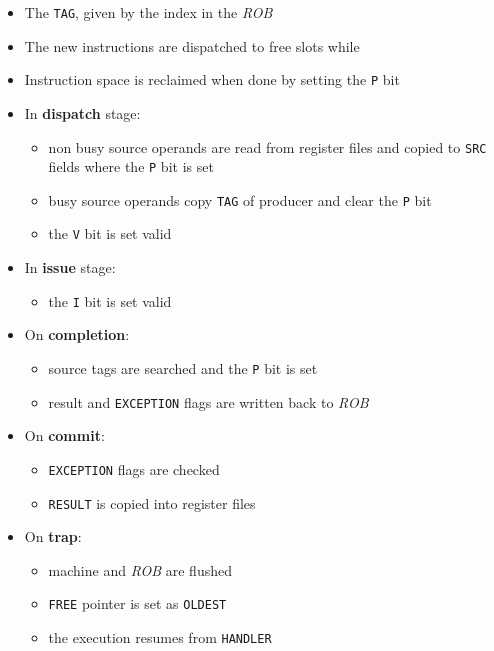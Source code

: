 \documentclass[english]{article}
\begin{document}
\begin{itemize}
  \item The \texttt{TAG}, given by the index in the \textit{ROB}
  \item The new instructions are dispatched to free slots while
  \item Instruction space is reclaimed when done by setting the \texttt{P} bit
  \item In \textbf{dispatch} stage:
        \begin{itemize}
          \item non busy source operands are read from register files and copied to \texttt{SRC} fields where the \texttt{P} bit is set
          \item busy source operands copy \texttt{TAG} of producer and clear the \texttt{P} bit
          \item the \texttt{V} bit is set valid
        \end{itemize}
  \item In \textbf{issue} stage:
        \begin{itemize}
          \item the \texttt{I} bit is set valid
        \end{itemize}
  \item On \textbf{completion}:
        \begin{itemize}
          \item source tags are searched and the \texttt{P} bit is set
          \item result and \texttt{EXCEPTION} flags are written back to \textit{ROB}
        \end{itemize}
  \item On \textbf{commit}:
        \begin{itemize}
          \item \texttt{EXCEPTION} flags are checked
          \item \texttt{RESULT} is copied into register files
        \end{itemize}
  \item On \textbf{trap}:
        \begin{itemize}
          \item machine and \textit{ROB} are flushed
          \item \texttt{FREE} pointer is set as \texttt{OLDEST}
          \item the execution resumes from \texttt{HANDLER}
        \end{itemize}
\end{itemize}
\end{document}
